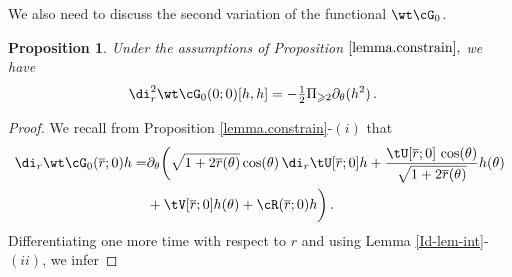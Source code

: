 \documentclass[a4paper,reqno,10pt]{article}
\newtheorem{pro}{Proposition}[section]
\newcommand{\pa}{\partial}
\begin{document}
We also need  to discuss the second variation of the functional $\wt\cG_{0}$.
{
\begin{pro}\label{lemma.constrain22}
	Under the assumptions of Proposition $\ref{lemma.constrain},$ we have
	\begin{align}\label{pula2}
		\di_{r}^2 \wt\cG_{0}(0;0)[h,h]& = -\tfrac12\Pi_{\geqslant2}\partial_\theta(h^2)\,.
	\end{align}
\end{pro}
}
\begin{proof}
We recall from Proposition \ref{lemma.constrain}-$(i)$ that
\begin{align*}
		\di_{r} \wt\cG_{0}(\overline r;0)h =& \pa_{\theta} \bigg(  \sqrt{1+2\overline r(\theta)} \cos(\theta) \, \di_{r}\tU[\overline r;0]h + \frac{\tU[\overline r;0]\, \cos(\theta)}{\sqrt{1+2\overline r(\theta)}}h(\theta)  \\
        &+ \tV[\overline r;0]h(\theta) + \cR(\overline r;0)h \bigg) \,.
	\end{align*}
    Differentiating one more time with respect to $r$ and using Lemma \ref{Id-lem-int}-$(ii)$, we infer
    

\end{proof}
\end{document}
